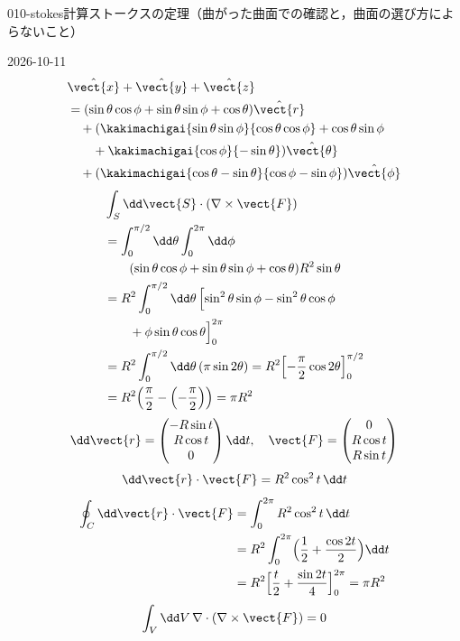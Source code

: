 \documentclass[uplatex,dvipdfmx,a4paper,11pt]{jsarticle}
\begin{document}
\begin{mondai}{010-stokes}{計算}{ストークスの定理（曲がった曲面での確認と，曲面の選び方によらないこと）}
\begin{kotaeutsushi}{2026-10-11}
\begin{align*}
&\hat{\vect{x}}+\hat{\vect{y}}+\hat{\vect{z}}\\
&=(\sin\theta\cos\phi+\sin\theta\sin\phi+\cos\theta)\hat{\vect{r}}\\
&\quad+(\kakimachigai{\sin\theta\sin\phi}{\cos\theta\cos\phi}+\cos\theta\sin\phi\\
&\qquad+\kakimachigai{\cos\phi}{-\sin\theta})\hat{\vect{\theta}}\\
&\quad+(\kakimachigai{\cos\theta-\sin\theta}{\cos\phi-\sin\phi})\hat{\vect{\phi}}
\end{align*}
\begin{align*}
&\int_{S}\dd\vect{S}\cdot(\nabla\times\vect{F})\\
&=\int_{0}^{\pi/2}\dd\theta\int_{0}^{2\pi}\dd\phi\\
&\qquad(\sin\theta\cos\phi+\sin\theta\sin\phi+\cos\theta)R^{2}\sin\theta\\
&=R^{2}\int_{0}^{\pi/2}\dd\theta\,\Bigl[\sin^{2}\theta\sin\phi-\sin^{2}\theta\cos\phi\\
&\qquad+\phi\sin\theta\cos\theta\Bigr]_{0}^{2\pi}\\
&=R^{2}\int_{0}^{\pi/2}\dd\theta\,(\pi\sin2\theta)=R^{2}\Bigl[-\frac{\pi}{2}\cos2\theta\Bigr]_{0}^{\pi/2}\\
&=R^{2}\Bigl(\frac{\pi}{2}-\Bigl(-\frac{\pi}{2}\Bigr)\Bigr)=\pi R^{2}
\end{align*}
\[ \dd\vect{r}=\begin{pmatrix}-R\sin t\\R\cos t\\0\end{pmatrix}\dd t,\quad\vect{F}=\begin{pmatrix}0\\R\cos t\\R\sin t\end{pmatrix} \]
\[ \dd\vect{r}\cdot\vect{F}=R^{2}\cos^{2}t\,\dd t \]
\begin{align*}
\oint_{C}\dd\vect{r}\cdot\vect{F}&=\int_{0}^{2\pi}R^{2}\cos^{2}t\,\dd t\\
&=R^{2}\int_{0}^{2\pi}\Bigl(\frac{1}{2}+\frac{\cos2t}{2}\Bigr)\dd t\\
&=R^{2}\Bigl[\frac{t}{2}+\frac{\sin2t}{4}\Bigr]_{0}^{2\pi}=\pi R^{2}
\end{align*}
\[ \int_{V}\dd V\,\nabla\cdot(\nabla\times\vect{F})=0 \]

\end{kotaeutsushi}
\end{mondai}
\end{document}

